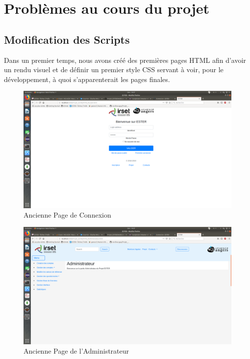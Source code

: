 \section{Problèmes au cours du projet}

\subsection{Modification des Scripts}

Dans un premier temps, nous avons créé des premières pages HTML afin d'avoir un rendu visuel et de définir un premier style CSS servant à voir, pour le développement, à quoi s'apparenterait les pages finales.

\begin{figure}[H]
    \begin{center}
	\includegraphics[scale=0.2,trim=4cm 0cm 4cm 5.3cm, clip=true]{img/OldConnexion}
    \end{center}
    \caption{Ancienne Page de Connexion}
\end{figure}

\begin{figure}[H]
    \begin{center}
	\includegraphics[scale=0.2,trim=2.8cm 0cm 0.8cm 5.3cm, clip=true]{img/OldAdmin}
    \end{center}
    \caption{Ancienne Page de l'Administrateur}
\end{figure}

